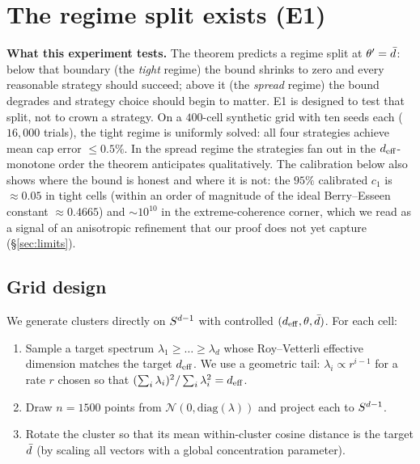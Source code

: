 \section{The regime split exists (E1)}
\label{sec:e1_validation}

\begin{intuition}
\textbf{What this experiment tests.} The theorem predicts a
regime split at $\theta' = \bar{d}$: below that boundary (the
\emph{tight} regime) the bound shrinks to zero and every
reasonable strategy should succeed; above it (the \emph{spread}
regime) the bound degrades and strategy choice should begin to
matter. E1 is designed to test that split, not to crown a
strategy. On a $400$-cell synthetic grid with ten seeds each
($16{,}000$ trials), the tight regime is uniformly solved: all
four strategies achieve mean cap error $\leq 0.5\%$. In the
spread regime the strategies fan out in the ${d_{\mathrm{eff}}}$-monotone order
the theorem anticipates qualitatively. The calibration below also
shows where the bound is honest and where it is not: the $95\%$
calibrated $c_1$ is $\approx 0.05$ in tight cells (within an order
of magnitude of the ideal Berry--Esseen constant $\approx 0.4665$)
and $\sim 10^{10}$ in the extreme-coherence corner, which we read
as a signal of an anisotropic refinement that our proof does not
yet capture (\S\ref{sec:limits}).
\end{intuition}

\subsection{Grid design}
\label{sec:e1:grid}

We generate clusters directly on $S^{d-1}$ with controlled
$({d_{\mathrm{eff}}}, \theta, \bar{d})$. For each cell:

\begin{enumerate}[leftmargin=1.8em, itemsep=2pt]
\item Sample a target spectrum $\lambda_1 \geq \ldots \geq \lambda_d$
whose Roy--Vetterli effective dimension matches the target ${d_{\mathrm{eff}}}$.
We use a geometric tail: $\lambda_i \propto r^{i-1}$ for a rate $r$
chosen so that $(\sum_i \lambda_i)^2 / \sum_i \lambda_i^2 = {d_{\mathrm{eff}}}$.
\item Draw $n = 1500$ points from $\mathcal{N}(0, \mathrm{diag}(\lambda))$
and project each to $S^{d-1}$.
\item Rotate the cluster so that its mean within-cluster cosine
distance is the target $\bar{d}$ (by scaling all vectors with a global
concentration parameter).
\end{enumerate}

